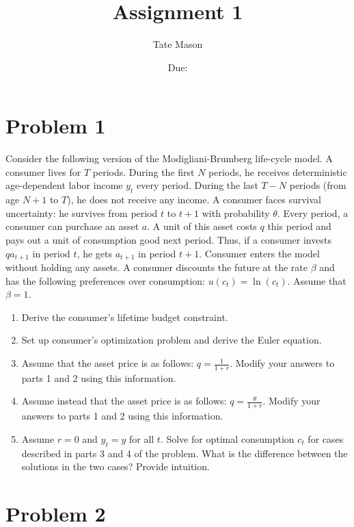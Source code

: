 \documentclass[10pt,a4paper]{article}
\begin{document}
\title{Assignment 1}
\author{Tate Mason}
\date{Due: }
\maketitle

\section*{Problem 1}

Consider the following version of the Modigliani-Brumberg life-cycle model. A consumer lives for $T$ periods. During the first $N$ periods, he receives deterministic age-dependent labor income $y_t$ every period. During the last $T-N$ periods (from age $N+1$ to $T$), he does not receive any income. A consumer faces survival uncertainty: he survives from period $t$ to $t+1$ with probability $\theta$. Every period, a consumer can purchase an asset $a$. A unit of this asset costs $q$ this period and pays out a unit of consumption good next period. Thus, if a consumer invests $q a_{t+1}$ in period $t$, he gets $a_{t+1}$ in period $t+1$. Consumer enters the model without holding any assets. A consumer discounts the future at the rate $\beta$ and has the following preferences over consumption: $u(c_t) = \ln(c_t)$. Assume that $\beta = 1$.

\begin{enumerate}
    \item Derive the consumer’s lifetime budget constraint.
    \item Set up consumer’s optimization problem and derive the Euler equation.
    \item Assume that the asset price is as follows: $q = \frac{1}{1 + r}$. Modify your answers to parts 1 and 2 using this information.
    \item Assume instead that the asset price is as follows: $q = \frac{\theta}{1 + r}$. Modify your answers to parts 1 and 2 using this information.
    \item Assume $r = 0$ and $y_t = y$ for all $t$. Solve for optimal consumption $c_t$ for cases described in parts 3 and 4 of the problem. What is the difference between the solutions in the two cases? Provide intuition.
\end{enumerate}

\section*{Problem 2}
\end{document}
